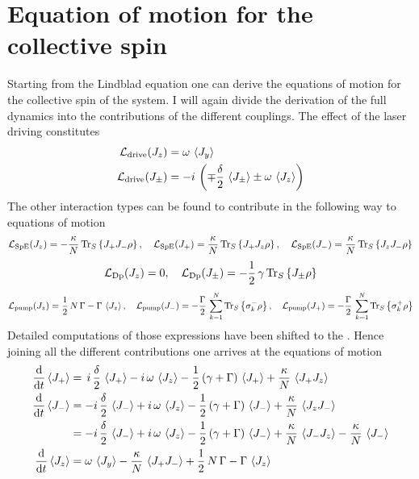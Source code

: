 \section{Equation of motion for the collective spin}\label{sec:mean_field_eq}%
Starting from the Lindblad equation one can derive the equations of motion for the collective spin of the system. I will again divide the derivation of the full dynamics into the contributions of the different couplings. The effect of the laser driving constitutes 
\begin{align*}
    \mathcal{L}_\text{drive}(J_z)&=\omega\,\braket{J_y}\\
    \mathcal{L}_\text{drive}(J_\pm)&=-i\,\left(\mp\frac{\delta}{2}\, \braket{J_\pm} \pm \omega\, \braket{J_z}\right)
\end{align*}
The other interaction types can be found to contribute in the following way to equations of motion
\begin{align*}
    \mathcal{L}_\text{SpE}(J_z)=-\frac{\kappa}{N}\,\text{Tr}_S\left\{J_+ J_- \rho\right\},\quad
    \mathcal{L}_\text{SpE}(J_+)=\frac{\kappa}{N}\,\text{Tr}_S\left\{J_+ J_z \rho\right\},\quad
    \mathcal{L}_\text{SpE}(J_-)=\frac{\kappa}{N}\,\text{Tr}_S\left\{J_z J_- \rho\right\}
\end{align*}
\begin{align}
    \mathcal{L}_\text{Dp}(J_z)=0,\quad
    \mathcal{L}_\text{Dp}(J_\pm)=-\frac{1}{2}\,\gamma\,\text{Tr}_S\left\{J_\pm\rho\right\}
\end{align}
\begin{align*}
    \mathcal{L}_\text{pump}(J_z)=\frac{1}{2}\,N\,\Gamma-\Gamma\,\braket{J_z},\quad
    \mathcal{L}_\text{pump}(J_-)=-\frac{\Gamma}{2}\,\sum_{k=1}^N\text{Tr}_S\left\{\sigma_k^-\rho\right\},\quad
    \mathcal{L}_\text{pump}(J_+)=-\frac{\Gamma}{2}\,\sum_{k=1}^N\text{Tr}_S\left\{\sigma_k^+\rho\right\}
\end{align*}
Detailed computations of those expressions have been shifted to the . Hence joining all the different contributions one arrives at the equations of motion
\begin{align}
    \frac{\text{d}}{\text{d}t} \braket{J_+}&=\,i\,\frac{\delta}{2}\,\braket{J_+}-i\,\omega\,\braket{J_z}-\frac{1}{2}\,(\gamma+\Gamma)\,\braket{J_+}+\frac{\kappa}{N}\,\braket{J_+ J_z}\notag\\
    \frac{\text{d}}{\text{d}t} \braket{J_-}&=-i\,\frac{\delta}{2}\,\braket{J_-}+i\,\omega\,\braket{J_z}-\frac{1}{2}\,(\gamma+\Gamma)\,\braket{J_-}+\frac{\kappa}{N}\,\braket{J_z J_-}\notag\\
    &=-i\,\frac{\delta}{2}\,\braket{J_-}+i\,\omega\,\braket{J_z}-\frac{1}{2}\,(\gamma+\Gamma)\,\braket{J_-}+\frac{\kappa}{N}\,\braket{J_- J_z}-\frac{\kappa}{N}\,\braket{J_-}\notag\\
    \frac{\text{d}}{\text{d}t} \braket{J_z}&=\omega\,\braket{J_y} - \frac{\kappa}{N}\,\braket{J_+ J_-}+\frac{1}{2}\,N\,\Gamma-\Gamma\,\braket{J_z}
\end{align}
